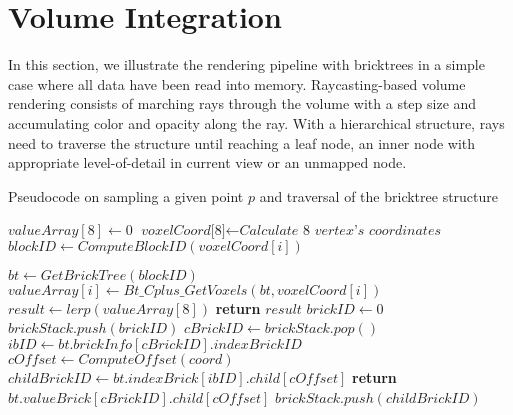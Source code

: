 \section{Volume Integration}
In this section, we illustrate the rendering pipeline with bricktrees in a
simple case where all data have been read into memory.  
Raycasting-based volume rendering consists of marching rays through the volume with
a step size and accumulating color and opacity along the ray. With a hierarchical
structure, rays need to traverse the structure until reaching a leaf node, an inner
node with appropriate level-of-detail in current view or an unmapped node. 


\begin{algorithm}
	\caption{Pseudocode on sampling a given point $p$ and traversal of the bricktree structure }\label{alg:sample}
	\begin{algorithmic}[1]
        	\State $valueArray[8]\gets \textit{0}$
            \State $\textit{voxelCoord[8]} \gets \textit{Calculate 8 vertex's coordinates}$
            	\State $blockID \gets ComputeBlockID(voxelCoord[i])$
            	
                \State $bt \gets GetBrickTree(blockID)$
            	\State $valueArray[i] \gets Bt\_Cplus\_GetVoxels(bt,voxelCoord[i])$
            \EndWhile
            \State $result \gets lerp(valueArray[8])$
            \State \textbf{return} $result$
    	\EndProcedure
        	\State $brickID\gets \textit{0}$
            \State $brickStack.push(brickID)$
            	\State $cBrickID \gets brickStack.pop()$
                \State $ibID \gets bt.brickInfo[cBrickID].indexBrickID$
            	\State $cOffset \gets ComputeOffset(coord)$
                \State $childBrickID \gets bt.indexBrick[ibID].child[cOffset]$
                	\State \textbf{return} $bt.valueBrick[cBrickID].child[cOffset]$
                \Else
                	\State $brickStack.push(childBrickID)$
                \EndIf
            \EndWhile
    	\EndProcedure
	\end{algorithmic}
\end{algorithm}

